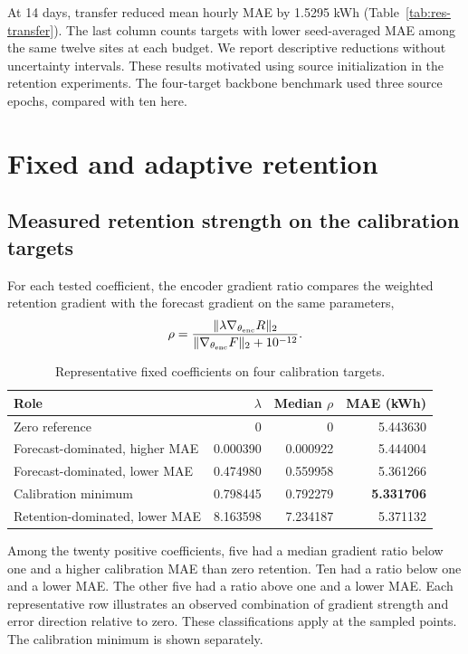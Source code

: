 At 14 days, transfer reduced mean hourly MAE by 1.5295 kWh (Table~\ref{tab:res-transfer}). The last column counts targets with lower seed-averaged MAE among the same twelve sites at each budget. We report descriptive reductions without uncertainty intervals. These results motivated using source initialization in the retention experiments. The four-target backbone benchmark used three source epochs, compared with ten here.
\section{Fixed and adaptive retention}
\subsection{Measured retention strength on the calibration targets}
For each tested coefficient, the encoder gradient ratio compares the weighted retention gradient with the forecast gradient on the same parameters,
\begin{equation}
\rho=\frac{\|\lambda\nabla_{\theta_{\rm enc}}R\|_2}{\|\nabla_{\theta_{\rm enc}}F\|_2+10^{-12}}.
\end{equation}
\begin{table}[H]\centering
\caption{Representative fixed coefficients on four calibration targets.}
\small\begin{tabular}{lrrr}\toprule
Role & $\lambda$ & Median $\rho$ & MAE (kWh)\\\midrule
Zero reference & 0 & 0 & 5.443630\\
Forecast-dominated, higher MAE & 0.000390 & 0.000922 & 5.444004\\
Forecast-dominated, lower MAE & 0.474980 & 0.559958 & 5.361266\\
Calibration minimum & 0.798445 & 0.792279 & \textbf{5.331706}\\
Retention-dominated, lower MAE & 8.163598 & 7.234187 & 5.371132\\\bottomrule
\end{tabular}
\end{table}
Among the twenty positive coefficients, five had a median gradient ratio below one and a higher calibration MAE than zero retention. Ten had a ratio below one and a lower MAE. The other five had a ratio above one and a lower MAE. Each representative row illustrates an observed combination of gradient strength and error direction relative to zero. These classifications apply at the sampled points. The calibration minimum is shown separately.

